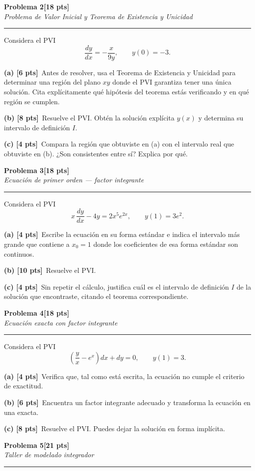 \documentclass[11pt,letterpaper]{article}
\newcommand{\problema}[3]{%
  \bigskip\bigskip\noindent
  {\Large\textbf{Problema #1}}\hfill\textbf{[#2 pts]}\\[3pt]
  {\small\itshape #3}\par
  \vspace{2pt}\hrule\vspace{8pt}
}
\newcommand{\subparte}[2]{%
  \medskip\noindent\textbf{(#1}\ #2\par
}
\begin{document}
\problema{2}{18}{Problema de Valor Inicial y Teorema de Existencia y Unicidad}

Considera el PVI
\[
\frac{dy}{dx} = -\frac{x}{9y}, \qquad y(0) = -3.
\]

\subparte{a) [6 pts]}{Antes de resolver, usa el Teorema de Existencia y Unicidad para determinar una región del plano $xy$ donde el PVI garantiza tener una única solución. Cita explícitamente qué hipótesis del teorema estás verificando y en qué región se cumplen.}

\subparte{b) [8 pts]}{Resuelve el PVI. Obtén la solución explícita $y(x)$ y determina su intervalo de definición $I$.}

\subparte{c) [4 pts]}{Compara la región que obtuviste en (a) con el intervalo real que obtuviste en (b). ¿Son consistentes entre sí? Explica por qué.}


\problema{3}{18}{Ecuación de primer orden — factor integrante}

Considera el PVI
\[
x\,\frac{dy}{dx} - 4y = 2x^5 e^{2x}, \qquad y(1) = 3e^2.
\]

\subparte{a) [4 pts]}{Escribe la ecuación en su forma estándar e indica el intervalo más grande que contiene a $x_0=1$ donde los coeficientes de esa forma estándar son continuos.}

\subparte{b) [10 pts]}{Resuelve el PVI.}

\subparte{c) [4 pts]}{Sin repetir el cálculo, justifica cuál es el intervalo de definición $I$ de la solución que encontraste, citando el teorema correspondiente.}

\problema{4}{18}{Ecuación exacta con factor integrante}

Considera el PVI
\[
\left(\frac{y}{x} - e^x\right) dx + dy = 0, \qquad y(1) = 3.
\]

\subparte{a) [4 pts]}{Verifica que, tal como está escrita, la ecuación no cumple el criterio de exactitud.}

\subparte{b) [6 pts]}{Encuentra un factor integrante adecuado y transforma la ecuación en una exacta.}

\subparte{c) [8 pts]}{Resuelve el PVI. Puedes dejar la solución en forma implícita.}


\problema{5}{21}{Taller de modelado integrador}
\end{document}
